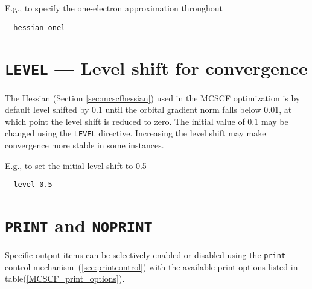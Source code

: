 E.g., to specify the one-electron approximation throughout
\begin{verbatim}
  hessian onel
\end{verbatim}

\section{{\tt LEVEL} --- Level shift for convergence}

The Hessian (Section \ref{sec:mcscfhessian}) used in the MCSCF
optimization is by default level shifted by 0.1 until the orbital
gradient norm falls below 0.01, at which point the level shift is
reduced to zero.  The initial value of $0.1$ may be changed using
the \verb+LEVEL+ directive.  Increasing the level shift may make
convergence more stable in some instances.

E.g., to set the initial level shift to 0.5
\begin{verbatim}
  level 0.5
\end{verbatim}

\section{{\tt PRINT} and {\tt NOPRINT}}

Specific output items can be selectively enabled or disabled using the
\verb+print+ control mechanism~(\ref{sec:printcontrol}) with the
available print options listed in table(\ref{MCSCF_print_options}).

